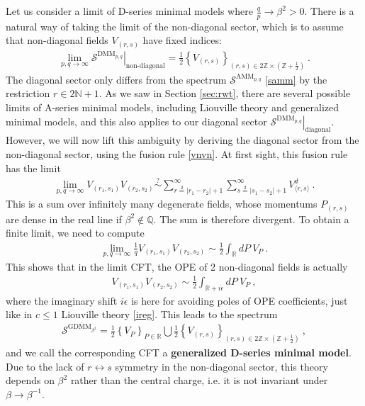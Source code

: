 \documentclass[12pt, a4paper]{article}
\newcommand{\myindex}[1]{\textbf{\boldmath #1}}
\theoremstyle{break}
\begin{document}
Let us consider a limit of D-series minimal models where $\frac{q}{p}\to \beta^2>0$. There is a natural way of taking the limit of the non-diagonal sector, which is to assume that non-diagonal fields $V_{(r,s)}$ have fixed indices:
\begin{align}
 \lim_{p,q\to\infty} \left. \mathcal{S}^{\text{DMM}_{p,q}} \right|_{\text{non-diagonal}} = 
 \frac12\left\{V_{(r,s)} \right\}_{ (r,s)\in 2\mathbb{Z}\times (\mathbb{Z}+\frac12)}\ .
\end{align}
The diagonal sector only differs from the spectrum $\mathcal{S}^{\text{AMM}_{p,q}}$ \eqref{samm} by the restriction $r\in 2\mathbb{N}+1$. 
As we saw in Section \ref{sec:rwt}, there are several possible limits of A-series minimal models, including Liouville theory and generalized minimal models, and this also applies to our diagonal sector $\left. \mathcal{S}^{\text{DMM}_{p,q}} \right|_{\text{diagonal}} $. However, we will now lift this ambiguity by deriving the diagonal sector from the non-diagonal sector, using the fusion rule \eqref{vnvn}. At first sight, this fusion rule has the limit  
\begin{align}
 \lim_{p,q\to\infty} V_{(r_1,s_1)} V_{(r_2,s_2)}  \overset{?}{\sim} \sum_{r\overset{2}{=}|r_1-r_2|+1}^{\infty} \sum_{s\overset{2}{=}|s_1-s_2|+1}^{\infty} V^d_{\langle r,s\rangle}\ .
\end{align}
This is a sum over infinitely many degenerate fields, whose momentums $P_{(r,s)}$ are dense in the real line if $\beta^2\notin \mathbb{Q}$. The sum is therefore divergent. To obtain a finite limit, we need to compute 
\begin{align}
 \lim_{p,q\to\infty} \frac{1}{q} V_{(r_1,s_1)} V_{(r_2,s_2)} \sim \frac12 \int_\mathbb{R} dP \ V_P\ .
\end{align}
This shows that in the limit CFT, the OPE of 2 non-diagonal fields is actually 
\begin{align}
 V_{(r_1,s_1)}V_{(r_2,s_2)} \sim \frac12 \int_{\mathbb{R}+i\epsilon} dP\ V_P\ ,
 \label{vrsvrs}
\end{align}
where the imaginary shift $i\epsilon$ is here for avoiding poles of OPE coefficients, just like in $c\leq 1$ Liouville theory \eqref{ireg}. This leads to the spectrum
\begin{align}
\boxed{\mathcal{S}^{\text{GDMM}_{\beta^2}} = \frac12 \left\{V_P\right\}_{P\in \mathbb{R}} \bigcup  \frac12\left\{V_{(r,s)} \right\}_{ (r,s)\in 2\mathbb{Z}\times (\mathbb{Z}+\frac12)}  }\ ,
\end{align}
and we call the corresponding CFT a \myindex{generalized D-series minimal model}. Due to the lack of $r\leftrightarrow s$ symmetry in the non-diagonal sector, this theory depends on $\beta^2$ rather than the central charge, i.e. it is not invariant under $\beta \to \beta^{-1}$. 
\end{document}

